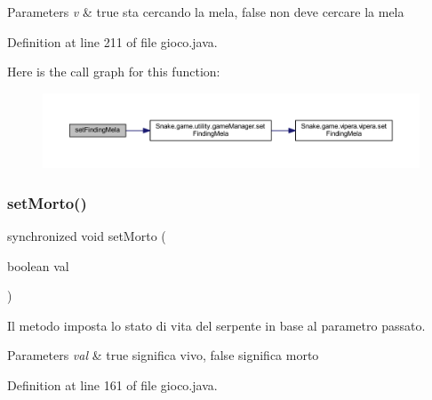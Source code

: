 \begin{DoxyParams}{Parameters}
{\em v} & true sta cercando la mela, false non deve cercare la mela \\
\hline
\end{DoxyParams}


Definition at line 211 of file gioco.\+java.

Here is the call graph for this function\+:
\nopagebreak
\begin{figure}[H]
\begin{center}
\leavevmode
\includegraphics[width=350pt]{class_snake_1_1game_1_1gioco_a4b25cde2a913ca9774e4db70bd5a584d_cgraph}
\end{center}
\end{figure}
\mbox{\label{class_snake_1_1game_1_1gioco_a118b98e3108dd550bb66d06db01eac41}} 
\subsubsection{\texorpdfstring{set\+Morto()}{setMorto()}}
{\footnotesize\ttfamily synchronized void set\+Morto (\begin{DoxyParamCaption}\item[{boolean}]{val }\end{DoxyParamCaption})}



Il metodo imposta lo stato di vita del serpente in base al parametro passato. 


\begin{DoxyParams}{Parameters}
{\em val} & true significa vivo, false significa morto \\
\hline
\end{DoxyParams}


Definition at line 161 of file gioco.\+java.

